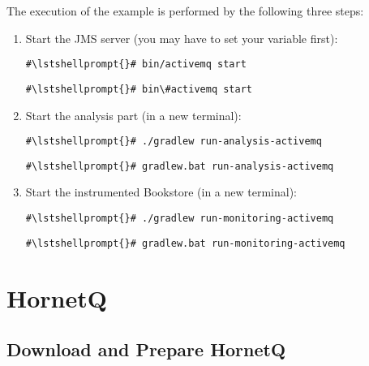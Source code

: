  The execution of the example is performed by the following three steps:
\begin{enumerate}
\item Start the JMS server (you may have to set your  variable first):

\setBashListing
\begin{lstlisting}[caption=Start of the JMS server under UNIX-like systems]
#\lstshellprompt{}# bin/activemq start
\end{lstlisting}
\begin{lstlisting}[caption=Start of the JMS server under Windows]
#\lstshellprompt{}# bin\#activemq start
\end{lstlisting}
\item Start the analysis part (in a new terminal):
\setBashListing
\begin{lstlisting}[caption=Start the analysis part under UNIX-like systems]
#\lstshellprompt{}# ./gradlew run-analysis-activemq
\end{lstlisting}
\begin{lstlisting}[caption=Start the analysis part under Windows]
#\lstshellprompt{}# gradlew.bat run-analysis-activemq
\end{lstlisting}
\item Start the instrumented Bookstore (in a new terminal):
\setBashListing
\begin{lstlisting}[caption=Start the analysis part under UNIX-like systems]
#\lstshellprompt{}# ./gradlew run-monitoring-activemq
\end{lstlisting}
\begin{lstlisting}[caption=Start the analysis part under Windows]
#\lstshellprompt{}# gradlew.bat run-monitoring-activemq
\end{lstlisting}
\end{enumerate}


\section{HornetQ}\label{example:jms:hornetq}

\subsection{Download and Prepare HornetQ}

